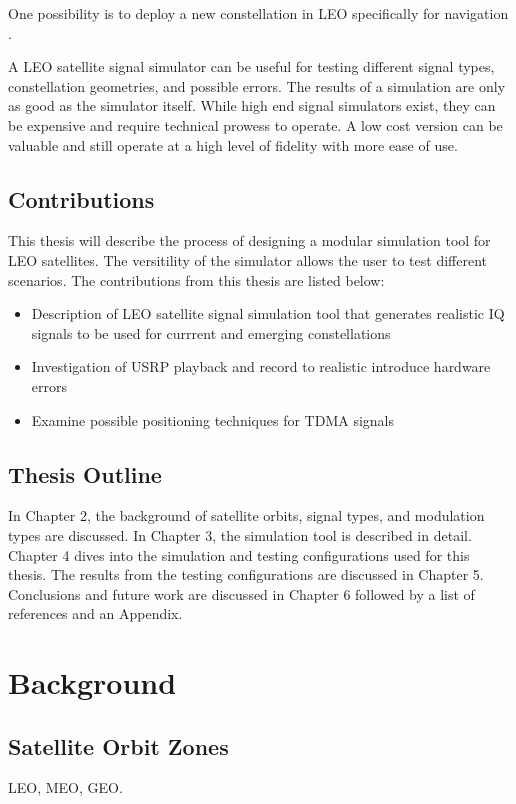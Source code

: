 \documentclass[12pt]{report}
\begin{document}
One possibility is to deploy a new constellation in LEO specifically for navigation  \cite{reidSatelliteNavigationAge2020}.


A LEO satellite signal simulator can be useful for testing different signal types, constellation geometries, and possible errors. The results of a simulation are only as good as the simulator itself. While high end signal simulators exist, they can be expensive and require technical prowess to operate. A low cost version can be valuable and still operate at a high level of fidelity with more ease of use. 

\section { Contributions}
This thesis will describe the process of designing a modular simulation tool for LEO satellites. The versitility of the simulator allows the user to test different scenarios. 
The contributions from this thesis are listed below:
\begin{itemize}
    \item Description of LEO satellite signal simulation tool that generates realistic IQ signals to be used for currrent and emerging constellations
    \item Investigation of USRP playback and record to realistic introduce hardware errors
    \item Examine possible positioning techniques for TDMA signals
    
\end{itemize}

\section{Thesis Outline}
In Chapter 2, the background of satellite orbits, signal types, and modulation types are discussed. In Chapter 3, the simulation tool is described in detail. Chapter 4 dives into the simulation and testing configurations used for this thesis. The results from the testing configurations are discussed in Chapter 5. Conclusions and future work are discussed in Chapter 6 followed by a list of references and an Appendix.


\chapter{Background}

\section{Satellite Orbit Zones}
LEO, MEO, GEO.
\end{document}
